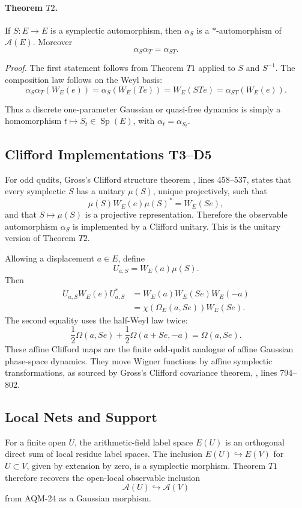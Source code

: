 \paragraph{Theorem \(T2\).}
If \(S:E\to E\) is a symplectic automorphism, then \(\alpha_S\) is a
\(*\)-automorphism of \(\mathcal A(E)\).  Moreover
\[
  \alpha_S\alpha_T=\alpha_{ST}.
\]

\emph{Proof.}
The first statement follows from Theorem \(T1\) applied to \(S\) and
\(S^{-1}\).  The composition law follows on the Weyl basis:
\[
  \alpha_S\alpha_T(W_E(e))=\alpha_S(W_E(Te))=W_E(STe)=\alpha_{ST}(W_E(e)).
\]

Thus a discrete one-parameter Gaussian or quasi-free dynamics is simply a
homomorphism \(t\mapsto S_t\in\operatorname{Sp}(E)\), with
\(\alpha_t=\alpha_{S_t}\).

\subsection{Clifford Implementations T3--D5}

For odd qudits, Gross's Clifford structure theorem
, lines 458--537, states that every symplectic \(S\) has a
unitary \(\mu(S)\), unique projectively, such that
\[
  \mu(S)W_E(e)\mu(S)^*=W_E(Se),
\]
and that \(S\mapsto\mu(S)\) is a projective representation.  Therefore the
observable automorphism \(\alpha_S\) is implemented by a Clifford unitary.
This is the unitary version of Theorem \(T2\).

Allowing a displacement \(a\in E\), define
\[
  U_{a,S}=W_E(a)\mu(S).
\]
Then
\[
\begin{aligned}
  U_{a,S}W_E(e)U_{a,S}^*
  &=
  W_E(a)W_E(Se)W_E(-a)\\
  &=
  \chi(\Omega_E(a,Se))W_E(Se).
\end{aligned}
\]
The second equality uses the half-Weyl law twice:
\[
  \frac12\Omega(a,Se)+\frac12\Omega(a+Se,-a)
  =
  \Omega(a,Se).
\]
These affine Clifford maps are the finite odd-qudit analogue of affine
Gaussian phase-space dynamics.  They move Wigner functions by affine
symplectic transformations, as sourced by Gross's Clifford covariance theorem,
, lines 794--802.

\subsection{Local Nets and Support}

For a finite open \(U\), the arithmetic-field label space \(E(U)\) is an
orthogonal direct sum of local residue label spaces.  The inclusion
\(E(U)\hookrightarrow E(V)\) for \(U\subset V\), given by extension by zero, is
a symplectic morphism.  Theorem \(T1\) therefore recovers the open-local
observable inclusion
\[
  \mathcal A(U)\hookrightarrow\mathcal A(V)
\]
from AQM-24 as a Gaussian morphism.

